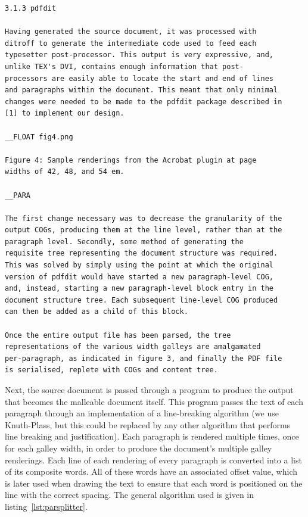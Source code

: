 \begin{lstlisting}[label=lst:sourcedoc,captionpos=b,float,caption={[An excerpt from a sample source document]An excerpt from a sample source document, itself an excerpt from \cite{Pinkney2011}. The document is parsed from top to bottom. Paragraphs are separated by blank lines. Floats are specified by lines that begin \texttt{\_\_FLOAT} and contain a reference to an image. Subsequent lines, until the next \texttt{\_\_FLOAT} or \texttt{\_\_PARA} marker, are assumed to be the float caption.}]
3.1.3 pdfdit

Having generated the source document, it was processed with
ditroff to generate the intermediate code used to feed each
typesetter post-processor. This output is very expressive, and,
unlike TEX's DVI, contains enough information that post-
processors are easily able to locate the start and end of lines
and paragraphs within the document. This meant that only minimal
changes were needed to be made to the pdfdit package described in
[1] to implement our design.

__FLOAT fig4.png

Figure 4: Sample renderings from the Acrobat plugin at page
widths of 42, 48, and 54 em.

__PARA

The first change necessary was to decrease the granularity of the
output COGs, producing them at the line level, rather than at the
paragraph level. Secondly, some method of generating the
requisite tree representing the document structure was required.
This was solved by simply using the point at which the original
version of pdfdit would have started a new paragraph-level COG,
and, instead, starting a new paragraph-level block entry in the
document structure tree. Each subsequent line-level COG produced
can then be added as a child of this block.

Once the entire output file has been parsed, the tree
representations of the various width galleys are amalgamated
per-paragraph, as indicated in figure 3, and finally the PDF file
is serialised, replete with COGs and content tree.

\end{lstlisting}


 Next, the source document is passed through a program to produce the output that becomes the malleable document itself. This program passes the text of each paragraph through an implementation of a line-breaking algorithm (we use Knuth-Plass, but this could be replaced by any other algorithm that performs line breaking and justification). Each paragraph is rendered multiple times, once for each galley width, in order to produce the document's multiple galley renderings. Each line of each rendering of every paragraph is converted into a list of its composite words. All of these words have an associated offset value, which is later used when drawing the text to ensure that each word is positioned on the line with the correct spacing. The general algorithm used is given in listing~\ref{lst:parsplitter}.


